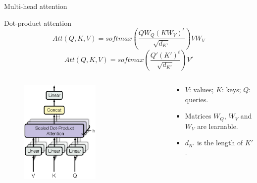 \documentclass[xcolor=pdftex,dvipsnames,table,mathserif]{beamer}
\begin{document}
\begin{frame}{Multi-head attention}


  \begin{block}{Dot-product attention}
    \[Att(Q,K,V) = softmax\left(\frac{QW_Q(KW_V)^t}{\sqrt{d_{K'}}}\right) VW_V \]
    \[Att(Q,K,V) = softmax\left(\frac{Q'(K')^t}{\sqrt{d_{K'}}}\right) V' \]
  \end{block}

\begin{columns}
  \begin{column}{.5\textwidth}
  \begin{figure}[ht]
    \centering
    \includegraphics[width=0.6\textwidth]{multi_head_attention}
  \end{figure}

  \end{column}

  \begin{column}{.5\textwidth}
  \begin{itemize}
  \item $V$: values; $K$: keys; $Q$: queries.
  \item Matrices $W_Q$, $W_V$ and $W_V$ are learnable.
  \item $d_{K'}$ is the length of $K'$.
  \end{itemize}

  \end{column}
\end{columns}



\end{frame}
\end{document}
